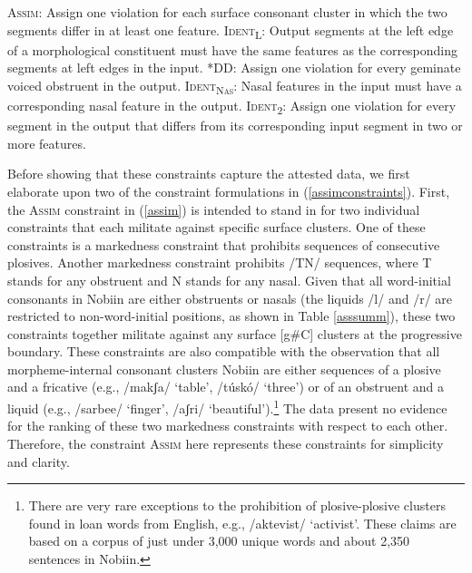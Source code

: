 \documentclass[output=paper]{langscibook}
\begin{document}
\ea \label{assimconstraints}

\begin{xlist}

\ex \label{assim} \textsc{Assim}: Assign one violation for each surface consonant cluster in which the two segments differ in at least one feature.
\ex \label{identons} \textsc{Ident\textsubscript{L}}: Output segments at the left edge of a morphological constituent must have the same features as the corresponding segments at left edges in the input.
% 
\ex \label{stardd} \textsc{*DD}: Assign one violation for every geminate voiced obstruent in the output. 
\ex \label{identnas} \textsc{Ident\textsubscript{Nas}}: Nasal features in the input must have a corresponding nasal feature in the output.
\ex \label{identweak} \textsc{Ident\textsubscript{2}}: Assign one violation for every segment in the output that differs from its corresponding input segment in two or more features.

\end{xlist}

\z

Before showing that these constraints capture the attested data, we first elaborate upon two of the constraint formulations in (\ref{assimconstraints}). First, the \textsc{Assim} constraint in (\ref{assim}) is intended to stand in for two individual constraints that each militate against specific surface clusters. One of these constraints is a markedness constraint that prohibits sequences of consecutive plosives. Another markedness constraint prohibits /TN/ sequences, where T stands for any obstruent and N stands for any nasal. Given that all word-initial consonants in Nobiin are either obstruents or nasals (the liquids /l/ and /r/ are restricted to non-word-initial positions, as shown in Table \ref{asssumm}), these two constraints together militate against any surface [g\#C] clusters at the progressive boundary. These constraints are also compatible with the observation that all morpheme-internal consonant clusters Nobiin are either sequences of a plosive and a fricative (e.g., /makʃa/ `table', /t\'usk\'o/ `three') or of an obstruent and a liquid (e.g., /sarbee/ `finger', /aʃri/ `beautiful').\footnote{There are very rare exceptions to the prohibition of plosive-plosive clusters found in loan words from English, e.g., /aktevist/ `activist'. These claims are based on a corpus of just under 3,000 unique words and about 2,350 sentences in Nobiin.} The data present no evidence for the ranking of these two markedness constraints with respect to each other. Therefore, the constraint \textsc{Assim} here represents these constraints for simplicity and clarity.
\end{document}
